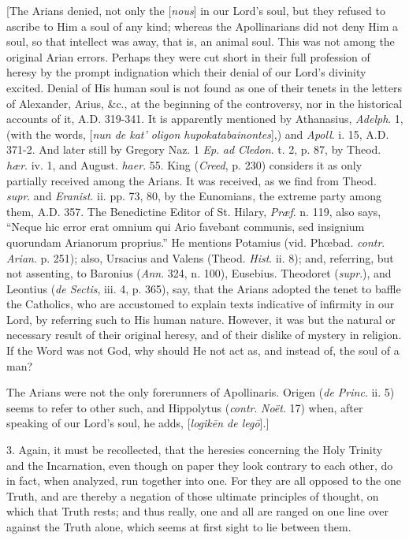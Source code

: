 [The Arians denied, not only the [\emph{nous}] in our Lord's soul,
but they refused to ascribe to Him a soul of any kind; whereas the
Apollinarians did not deny Him a soul, so that intellect was away,
that is, an animal soul. This was not among the original Arian errors.
Perhaps they were cut short in their full profession of heresy by the
prompt indignation which their denial of our Lord's divinity excited. Denial of His human soul is not found as one of their tenets
in the letters of Alexander, Arius, \&c., at the beginning of the
controversy, nor in the historical accounts of it, A.D.
319-341. It is apparently mentioned by Athanasius, \emph{Adelph}. 1,
(with the words, [\emph{nun de kat' oligon hupokatabainontes}],) and \emph{Apoll}.
i. 15, A.D. 371-2. And
later still by Gregory Naz. 1 \emph{Ep}. \emph{ad Cledon}. t. 2, p.
87, by Theod. \emph{hær}. iv. 1, and August. \emph{haer}. 55. King (\emph{Creed},
p. 230) considers it as only partially received among the Arians. It
was received, as we find from Theod. \emph{supr}. and \emph{Eranist}.
ii. pp. 73, 80, by the Eunomians, the extreme party among them, A.D.
357. The Benedictine Editor of St. Hilary, \emph{Præf}. n. 119, also
says, ``Neque hic error erat omnium qui Ario favebant communis,
sed insignium quorundam Arianorum proprius.'' He mentions Potamius
(vid. Phœbad. \emph{contr}. \emph{Arian}. p. 251); also, Ursacius and
Valens (Theod. \emph{Hist}. ii. 8); and, referring, but not assenting,
to Baronius (\emph{Ann}. 324, n. 100), Eusebius. Theodoret (\emph{supr}.),
and Leontius (\emph{de Sectis}, iii. 4, p. 365), say, that the Arians
adopted the tenet to baffle the Catholics, who are accustomed to
explain texts indicative of infirmity in our Lord, by referring such
to His human nature. However, it was but the natural or necessary
result of their original heresy, and of their dislike of mystery in
religion. If the Word was not God, why should He not act as, and
instead of, the soul of a man?

The Arians were not the only forerunners of Apollinaris. Origen (\emph{de
Princ}. ii. 5) seems to refer to other such, and Hippolytus (\emph{contr}.
\emph{Noët}. 17) when, after speaking of our Lord's soul, he adds, [\emph{logik\={e}n
de leg\={o}}].]

3. Again, it must be recollected, that the heresies concerning the
Holy Trinity and the Incarnation, even though on paper they look
contrary to each other, do in fact, when analyzed, run together into
one. For they are all opposed to the one Truth, and are thereby a
negation of those ultimate principles of thought, on which that Truth
rests; and thus really, one and all are ranged on one line over
against the Truth alone, which seems at first sight to lie between
them.


